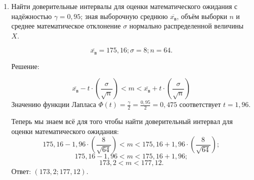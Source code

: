 \documentclass{article}
\begin{document}
\begin{enumerate}
\item %
Найти доверительные интервалы для оценки математического ожидания с надёжностью $\gamma=0,95$; зная выборочную среднюю $\overline{x_\textit{в}}$, объём выборки $n$ и среднее математическое отклонение $\sigma$ нормально распределенной величины $X$.

$$\overline{x_\textit{в}}=175,16; \sigma=8; n=64.$$
\begin{center}Решение:\end{center}
$$\overline{x_\textit{в}}-t\cdot\left(\frac{\sigma}{\sqrt{n}}\right)<m<\overline{x_\textit{в}}+t\cdot\left(\frac{\sigma}{\sqrt{n}}\right)$$
Значению функции Лапласа $\Phi(t)=\frac{\gamma}{2}=\frac{0,95}{2}=0,475$ соответствует $t=1,96$.

Теперь мы знаем всё для того чтобы найти доверительный интервал для оценки математического ожидания:
$$175,16-1,96\cdot\left(\frac{8}{\sqrt{64}}\right)<m<175,16+1,96\cdot\left(\frac{8}{\sqrt{64}}\right);$$
$$175,16-1,96<m<175,16+1,96;$$
$$173,2<m<177,12.$$
Ответ: $(173,2;177,12)$.

\end{enumerate}
\end{document}
